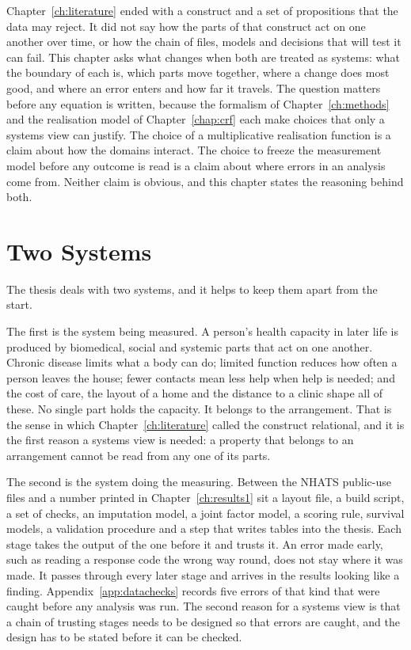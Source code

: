 
\noindent
Chapter~\ref{ch:literature} ended with a construct and a set of propositions
that the data may reject. It did not say how the parts of that construct act on
one another over time, or how the chain of files, models and decisions that
will test it can fail. This chapter asks what changes when both are treated as
systems: what the boundary of each is, which parts move together, where a
change does most good, and where an error enters and how far it travels. The
question matters before any equation is written, because the formalism of
Chapter~\ref{ch:methods} and the realisation model of Chapter~\ref{chap:crf}
each make choices that only a systems view can justify. The choice of a
multiplicative realisation function is a claim about how the domains interact.
The choice to freeze the measurement model before any outcome is read is a
claim about where errors in an analysis come from. Neither claim is obvious, and
this chapter states the reasoning behind both.

\section{Two Systems}
\label{sec:sys-intro}

The thesis deals with two systems, and it helps to keep them apart from the
start.

The first is the system being measured. A person's health capacity in later
life is produced by biomedical, social and systemic parts that act on one
another. Chronic disease limits what a body can do; limited function reduces
how often a person leaves the house; fewer contacts mean less help when help
is needed; and the cost of care, the layout of a home and the distance to a
clinic shape all of these. No single part holds the capacity. It belongs to
the arrangement. That is the sense in which Chapter~\ref{ch:literature}
called the construct relational, and it is the first reason a systems view is
needed: a property that belongs to an arrangement cannot be read from any one
of its parts.

The second is the system doing the measuring. Between the NHATS public-use
files and a number printed in Chapter~\ref{ch:results1} sit a layout file, a
build script, a set of checks, an imputation model, a joint factor model, a
scoring rule, survival models, a validation procedure and a step that writes
tables into the thesis. Each stage takes the output of the one before it and
trusts it. An error made early, such as reading a response code the wrong way
round, does not stay where it was made. It passes through every later stage
and arrives in the results looking like a finding. Appendix~\ref{app:datachecks}
records five errors of that kind that were caught before any analysis was run.
The second reason for a systems view is that a chain of trusting stages needs
to be designed so that errors are caught, and the design has to be stated
before it can be checked.

